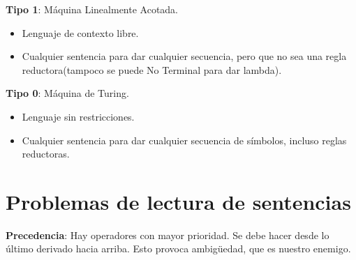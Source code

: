 \documentclass[12pt, twoside, openright]{report} %
\begin{document}
\textbf{Tipo 1}: Máquina Linealmente Acotada.

\begin{itemize}
	\item Lenguaje de contexto libre.
	\item Cualquier sentencia para dar cualquier secuencia, pero que no sea una
	      regla reductora(tampoco se puede No Terminal para dar lambda).
\end{itemize}

\textbf{Tipo 0}: Máquina de Turing.

\begin{itemize}
	\item Lenguaje sin restricciones.
	\item Cualquier sentencia para dar cualquier secuencia de símbolos, incluso
	      reglas reductoras.
\end{itemize}

\section{Problemas de lectura de sentencias}

\textbf{Precedencia}: Hay operadores con mayor prioridad. Se debe hacer
desde lo último derivado hacia arriba. Esto provoca ambigüedad, que es
nuestro enemigo.
\end{document}
